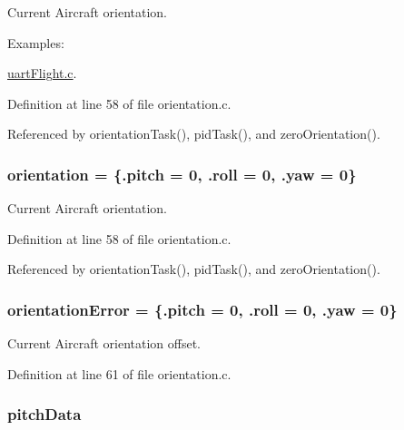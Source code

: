 Current Aircraft orientation. 

\begin{Desc}
\item[Examples\-: ]\par
\hyperlink{uart_flight_8c-example}{uart\-Flight.\-c}.\end{Desc}


Definition at line 58 of file orientation.\-c.



Referenced by orientation\-Task(), pid\-Task(), and zero\-Orientation().

\hypertarget{group__orientation_gacd4a2942520b68691db5aebde4e537a4}{
\subsubsection[{orientation}]{ orientation = \{.pitch = 0, .roll = 0, .yaw = 0\}}}\label{group__orientation_gacd4a2942520b68691db5aebde4e537a4}


Current Aircraft orientation. 



Definition at line 58 of file orientation.\-c.



Referenced by orientation\-Task(), pid\-Task(), and zero\-Orientation().

\hypertarget{group__orientation_gab42c272957b0a5cdc11845ade183c2f9}{
\subsubsection[{orientation\-Error}]{ orientation\-Error = \{.pitch = 0, .roll = 0, .yaw = 0\}}}\label{group__orientation_gab42c272957b0a5cdc11845ade183c2f9}


Current Aircraft orientation offset. 



Definition at line 61 of file orientation.\-c.

\hypertarget{group__orientation_gaee2ebdd37342c4cfa69ce7ee1440fd1d}{
\subsubsection[{pitch\-Data}]{ pitch\-Data}}\label{group__orientation_gaee2ebdd37342c4cfa69ce7ee1440fd1d}


